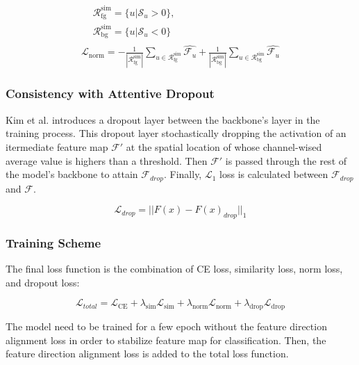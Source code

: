 \documentclass[conference]{IEEEtran}
\begin{document}
\begin{gather} \label{eq:norm loss}
    \begin{aligned}
         & \mathcal{R}_{\text{fg}}^{\text{sim}} = \{u|\mathcal{S}_u>0\}, & \\
         & \mathcal{R}_{\text{bg}}^{\text{sim}} = \{u|\mathcal{S}_u<0\}  &
    \end{aligned} \\
    \mathcal{L}_{\text{norm}} = -\frac{1}{|\mathcal{R}_{\text{fg}}^{\text{sim}}|}\sum_{u\in\mathcal{R}_{\text{fg}}^{\text{sim}}}{\hat{\mathcal{F}_u}} + \frac{1}{|\mathcal{R}_{\text{bg}}^{\text{sim}}|}\sum_{u\in\mathcal{R}_{\text{bg}}^{\text{sim}}}{\hat{\mathcal{F}_u}}
\end{gather}


\subsubsection{Consistency with Attentive Dropout}
Kim et al. \cite{kim2022bridging} introduces a dropout layer between the backbone's layer in the training process. This dropout layer stochastically dropping the activation of an itermediate feature map $\mathcal{F}'$ at the spatial location of whose channel-wised average value is highers than a threshold. Then $\mathcal{F}'$ is passed through the rest of the model's backbone to attain $\mathcal{F}_{drop}$. Finally, $\mathcal{L}_1$ loss is calculated between $\mathcal{F}_{drop}$ and $\mathcal{F}$.

\begin{equation} \label{eq:drop loss}
    \mathcal{L}_{drop} = ||F(x) - F(x)_{drop}||_1
\end{equation}

\subsubsection{Training Scheme}
The final loss function is the combination of CE loss, similarity loss, norm loss, and dropout loss:

\begin{equation} \label{eq:total loss}
    \mathcal{L}_{total} = \mathcal{L}_{\text{CE}} + \lambda_{\text{sim}}\mathcal{L}_{\text{sim}} + \lambda_{\text{norm}}\mathcal{L}_{\text{norm}} + \lambda_{\text{drop}}\mathcal{L}_{\text{drop}}
\end{equation}

The model need to be trained for a few epoch without the feature direction alignment loss in order to stabilize feature map for classification. Then, the feature direction alignment loss is added to the total loss function.
\end{document}
